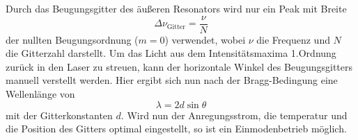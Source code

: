 Durch das Beugungsgitter des äußeren Resonators wird nur ein Peak mit Breite
\begin{equation}
  \Delta\nu_{\text{Gitter}} = \frac{\nu}{N}
\end{equation}
der nullten Beugungsordnung ($m=\num{0}$) verwendet, wobei $\nu$ die Frequenz
und $N$ die Gitterzahl darstellt. Um das Licht aus dem Intensitätsmaxima 1.Ordnung
zurück in den Laser zu streuen, kann der horizontale Winkel \theta des Beugungsgitters
manuell verstellt werden. Hier ergibt sich nun nach der Bragg-Bedingung eine
Wellenlänge von
\begin{equation}
    \lambda = 2d\sin{\theta}
\end{equation}
mit der Gitterkonstanten $d$. Wird nun der Anregungsstrom, die temperatur und die
Position des Gitters optimal eingestellt, so ist ein Einmodenbetrieb möglich.
